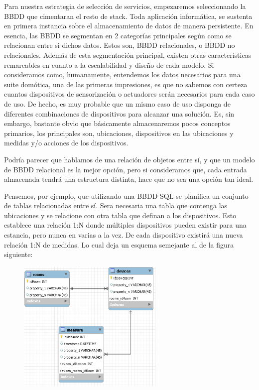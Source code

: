 Para nuestra estrategia de selección de servicios, empezaremos seleccionando la BBDD que cimentaran el resto de stack. Toda aplicación informática, se sustenta en primera instancia sobre el almacenamiento de datos de manera persistente. En esencia, las BBDD se segmentan en 2 categorías principales según como se relacionan entre si dichos datos. Estos son, BBDD relacionales, o BBDD no relacionales. Además de esta segmentación principal, existen otras características remarcables en cuanto a la escalabilidad y diseño de cada modelo. Si consideramos como, humanamente, entendemos los datos necesarios para una suite domótica, una de las primeras impresiones, es que no sabemos con certeza cuantos dispositivos de sensorización o actuadores serán necesarios para cada caso de uso. De hecho, es muy probable que un mismo caso de uso disponga de diferentes combinaciones de dispositivos para alcanzar una solución. Es, sin embargo, bastante obvio que básicamente almacenaremos pocos conceptos primarios, los principales son, ubicaciones, dispositivos en las ubicaciones y medidas y/o acciones de los dispositivos.

Podría parecer que hablamos de una relación de objetos entre sí, y que un modelo de BBDD relacional es la mejor opción, pero si consideramos que, cada entrada almacenada tendrá una estructura distinta, hace que no sea una opción tan ideal.

Pensemos, por ejemplo, que utilizando una BBDD SQL se planifica un conjunto de tablas relacionadas entre sí. Sera necesaria una tabla que contenga las ubicaciones y se relacione con otra tabla que definan a los dispositivos. Esto establece una relación 1:N donde múltiples dispositivos pueden existir para una estancia, pero nunca en varias a la vez. De cada dispositivo existirá una nueva relación 1:N de medidas. Lo cual deja un esquema semejante al de la figura siguiente:


\begin{figure}[hbt!]
\centering
\includegraphics[height=2.5in]{figures/SQLSchemaExample_1.png}
\end{figure}

